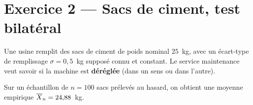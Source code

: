 \newpage

\section*{Exercice 2 --- Sacs de ciment, test bilatéral}

Une usine remplit des sacs de ciment de poids nominal $25$~kg, avec un écart-type de remplissage $\sigma = 0{,}5$~kg supposé connu et constant. Le service maintenance veut savoir si la machine est \textbf{déréglée} (dans un sens ou dans l'autre).

Sur un échantillon de $n=100$ sacs prélevés au hasard, on obtient une moyenne empirique $\overline{X}_n = 24{,}88$~kg.

